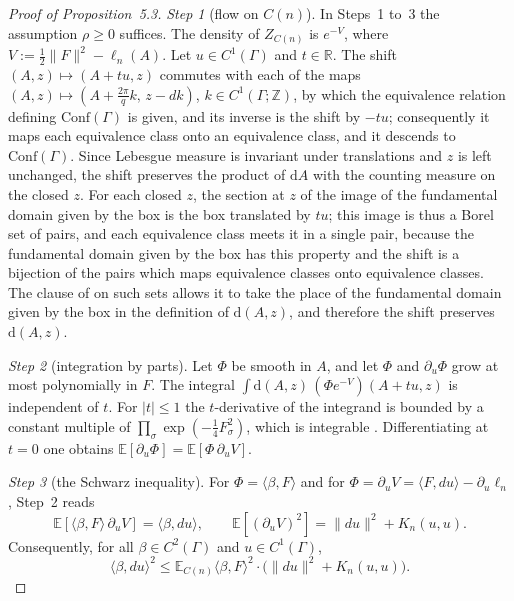 \documentclass[11pt]{amsart}
\theoremstyle{definition}
\begin{document}
\begin{proof}[Proof of Proposition~5.3]
\emph{Step 1} (flow on $C(n)$).
In Steps~1 to~3 the assumption $\rho\ge0$ suffices.
The density of $Z_{C(n)}$ is $e^{-V}$, where $V:=\frac12\|F\|^2-\ell_n(A)$.
Let $u\in C^1(\Gamma)$ and $t\in\mathbb R$.
The shift $(A,z)\mapsto(A+tu,z)$ commutes with each of the maps $(A,z)\mapsto(A+\frac{2\pi}{q}k,\,z-dk)$, $k\in C^1(\Gamma;\mathbb Z)$, by which the equivalence relation defining $\mathrm{Conf}(\Gamma)$ is given, and its inverse is the shift by $-tu$;
consequently it maps each equivalence class onto an equivalence class, and it descends to $\mathrm{Conf}(\Gamma)$.
Since Lebesgue measure is invariant under translations and $z$ is left unchanged, the shift preserves the product of $\mathrm dA$ with the counting measure on the closed $z$.
For each closed $z$, the section at $z$ of the image of the fundamental domain given by the box is the box translated by $tu$;
this image is thus a Borel set of pairs, and each equivalence class meets it in a single pair, because the fundamental domain given by the box has this property and the shift is a bijection of the pairs which maps equivalence classes onto equivalence classes.
The clause of \cite[Definition~2.6]{QEDII} on such sets allows it to take the place of the fundamental domain given by the box in the definition of $\mathrm d(A,z)$, and therefore the shift preserves $\mathrm d(A,z)$.

\emph{Step 2} (integration by parts).
Let $\Phi$ be smooth in $A$, and let $\Phi$ and $\partial_u\Phi$ grow at most polynomially in $F$.
The integral $\int\mathrm d(A,z)\,(\Phi e^{-V})(A+tu,z)$ is independent of $t$.
For $|t|\le1$ the $t$-derivative of the integrand is bounded by a constant multiple of $\prod_\sigma\exp(-\frac14F_\sigma^2)$, which is integrable \cite[Lemma~3.14]{QEDII}.
Differentiating at $t=0$ one obtains $\mathbb E[\partial_u\Phi]=\mathbb E[\Phi\,\partial_uV]$.

\emph{Step 3} (the Schwarz inequality).
For $\Phi=\langle\beta,F\rangle$ and for $\Phi=\partial_uV=\langle F,du\rangle-\partial_u\ell_n$, Step~2 reads
\begin{equation*}
\mathbb E[\langle\beta,F\rangle\,\partial_uV]=\langle\beta,du\rangle,\qquad\mathbb E[(\partial_uV)^2]=\|du\|^2+K_n(u,u).
\end{equation*}
Consequently, for all $\beta\in C^2(\Gamma)$ and $u\in C^1(\Gamma)$,
\begin{equation*}
\langle\beta,du\rangle^2\le\mathbb E_{C(n)}\langle\beta,F\rangle^2\cdot\bigl(\|du\|^2+K_n(u,u)\bigr).
\end{equation*}


\end{proof}
\end{document}
